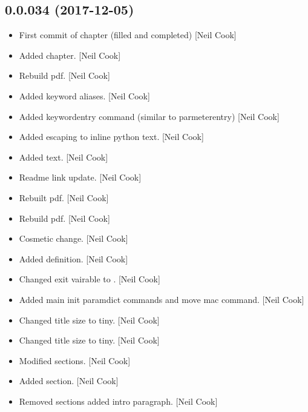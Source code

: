 \documentclass[a4paper,10pt,english]{report}
\begin{document}
\subsection{0.0.034 (2017-12-05)}
\label{\detokenize{misc/changelog:id518}}\begin{itemize}
\item {} 
First commit of  chapter (filled and completed) {[}Neil
Cook{]}

\item {} 
Added  chapter. {[}Neil Cook{]}

\item {} 
Rebuild pdf. {[}Neil Cook{]}

\item {} 
Added keyword aliases. {[}Neil Cook{]}

\item {} 
Added keywordentry command (similar to parmeterentry) {[}Neil Cook{]}

\item {} 
Added escaping to inline python text. {[}Neil Cook{]}

\item {} 
Added text. {[}Neil Cook{]}

\item {} 
Readme link update. {[}Neil Cook{]}

\item {} 
Rebuilt pdf. {[}Neil Cook{]}

\item {} 
Rebuild pdf. {[}Neil Cook{]}

\item {} 
Cosmetic change. {[}Neil Cook{]}

\item {} 
Added  definition. {[}Neil Cook{]}

\item {} 
Changed exit vairable to . {[}Neil Cook{]}

\item {} 
Added main init paramdict commands and move mac command. {[}Neil Cook{]}

\item {} 
Changed title size to tiny. {[}Neil Cook{]}

\item {} 
Changed title size to tiny. {[}Neil Cook{]}

\item {} 
Modified sections. {[}Neil Cook{]}

\item {} 
Added section. {[}Neil Cook{]}

\item {} 
Removed sections added intro paragraph. {[}Neil Cook{]}

\end{itemize}
\end{document}
